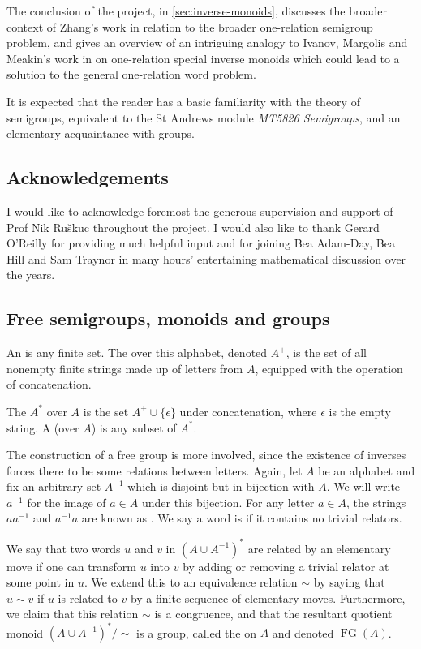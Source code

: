 \documentclass[noindex,noinsetproof,12pt]{lmaths}
\DeclareMathOperator{\FG}{FG}
\begin{document}
The conclusion of the project, in \cref{sec:inverse-monoids}, discusses the broader context of Zhang's work in relation to the broader one-relation semigroup problem, and gives an overview of an intriguing analogy to Ivanov, Margolis and Meakin's work in \cite{Ivanov2001} on one-relation special inverse monoids which could lead to a solution to the general one-relation word problem.

It is expected that the reader has a basic familiarity with the theory of semigroups, equivalent to the St Andrews module \emph{MT5826 Semigroups}, and an elementary acquaintance with groups.

\subsection*{Acknowledgements}
I would like to acknowledge foremost the generous supervision and support of Prof Nik Ruškuc throughout the project. I would also like to thank Gerard O'Reilly for providing much helpful input and for joining Bea Adam-Day, Bea Hill and Sam Traynor in many hours' entertaining mathematical discussion over the years.

\subsection{Free semigroups, monoids and groups}

An  is any finite set. The  over this alphabet, denoted $A^{+}$, is the set of all nonempty finite strings made up of letters from $A$, equipped with the operation of concatenation.

The  $A^*$ over $A$ is the set $A^+ \cup \{\epsilon\}$ under concatenation, where $\epsilon$ is the empty string. A  (over $A$) is any subset of $A^*$.

The construction of a free group is more involved, since the existence of inverses forces there to be some relations between letters. Again, let $A$ be an alphabet and fix an arbitrary set $A^{-1}$ which is disjoint but in bijection with $A$. We will write $a^{-1}$ for the image of $a \in A$ under this bijection. For any letter $a \in A$, the strings $aa^{-1}$ and $a^{-1}a$ are known as . We say a word is  if it contains no trivial relators.

We say that two words $u$ and $v$ in $(A \cup A^{-1})^*$ are related by an elementary move if one can transform $u$ into $v$ by adding or removing a trivial relator at some point in $u$. We extend this to an equivalence relation $\sim$ by saying that $u \sim v$ if $u$ is related to $v$ by a finite sequence of elementary moves.  Furthermore, we claim that this relation $\sim$ is a congruence, and that the resultant quotient monoid $(A \cup A^{-1})^*/{\sim}$ is a group, called the  on $A$ and denoted $\FG(A)$.
\end{document}
